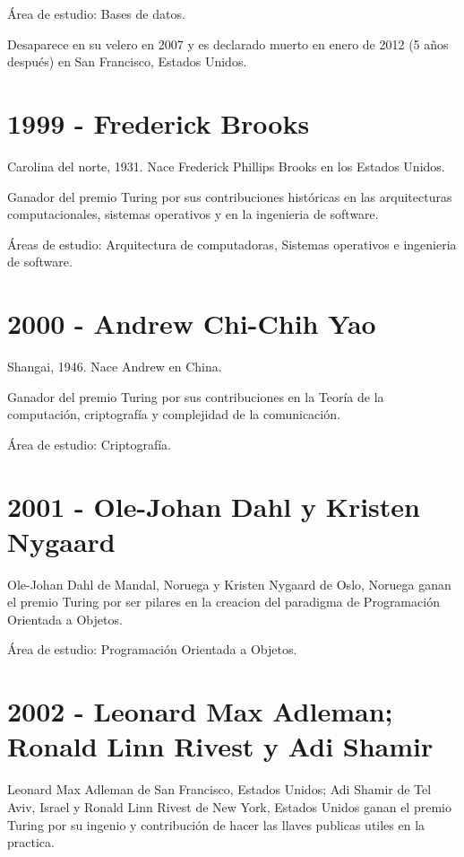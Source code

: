 \documentclass[notitlepage,letterpaper, 11pt]{article}
\begin{document}
\noindent Área de estudio: Bases de datos. 

\noindent Desaparece en su velero en 2007 y es declarado muerto en enero de 2012 (5 años después) en San Francisco, Estados Unidos.
\newline

\section*{1999 - Frederick Brooks}
\noindent Carolina del norte, 1931. Nace Frederick Phillips Brooks en los Estados Unidos.

\noindent Ganador del premio Turing por sus contribuciones históricas en las arquitecturas computacionales, sistemas operativos y en la ingenieria de software.

\noindent Áreas de estudio: Arquitectura de computadoras, Sistemas operativos e ingenieria de software. 
\newline

\section*{2000 - Andrew Chi-Chih Yao}
\noindent Shangai, 1946. Nace Andrew en China.

\noindent Ganador del premio Turing por sus contribuciones en la Teoría de la computación, criptografía y complejidad de la comunicación.

\noindent Área de estudio: Criptografía. 
\newline


\section*{2001 - Ole-Johan Dahl y Kristen Nygaard}
\noindent Ole-Johan Dahl de Mandal, Noruega y Kristen Nygaard  de Oslo, Noruega  ganan el premio Turing por ser pilares en la creacion del paradigma de Programación Orientada a Objetos.

\noindent Área de estudio: Programación Orientada a Objetos.
\newline

\section*{2002 - Leonard Max Adleman; Ronald Linn Rivest y Adi Shamir}
\noindent Leonard Max Adleman de San Francisco, Estados Unidos; Adi Shamir de Tel Aviv, Israel y  Ronald Linn Rivest de New York, Estados Unidos  ganan el premio Turing por su ingenio y contribución de hacer las llaves publicas utiles en la practica.
\end{document}

